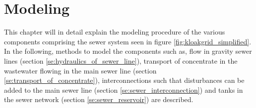 \chapter{Modeling}\label{se:modeling}

This chapter will in detail explain the modeling procedure of the various components comprising the sewer system seen in figure \ref{fig:kloakgrid_simplified}.
In the following, methods to model the components such as, flow in gravity sewer lines (section \ref{se:hydraulics_of_sewer_line}), transport of concentrate in the wastewater flowing in the main sewer line (section \ref{se:transport_of_concentrate}), interconnections such that disturbances can be added to the main sewer line (section \ref{se:sewer_interconnection}) and tanks in the sewer network (section \ref{se:sewer_reservoir}) are described. 







